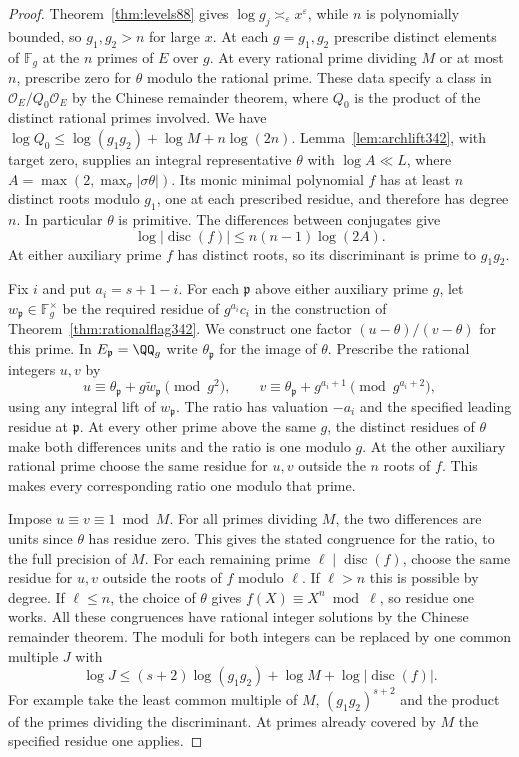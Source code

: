 \documentclass[a4paper,11pt]{article}
\theoremstyle{definition}
\theoremstyle{remark}
\numberwithin{equation}{section}
\begin{document}
\begin{proof}
Theorem~\ref{thm:levels88} gives $\log g_j\asymp_\varepsilon
x^\varepsilon$, while $n$ is polynomially bounded, so $g_1,g_2>n$
for large $x$. At each $g=g_1,g_2$ prescribe distinct elements of
$\mathbb F_g$ at the $n$ primes of $E$ over $g$. At every rational
prime dividing $M$ or at most $n$, prescribe zero for $\theta$ modulo
the rational prime. These data specify a class in
$\mathcal O_E/Q_0\mathcal O_E$ by the Chinese remainder theorem,
where $Q_0$ is the product of the distinct rational primes involved.
We have $\log Q_0\le\log(g_1g_2)+\log M+n\log(2n)$.
Lemma~\ref{lem:archlift342}, with target zero, supplies an integral
representative $\theta$ with $\log A\ll L$, where
$A=\max(2,\max_\sigma|\sigma\theta|)$. Its monic minimal polynomial
$f$ has at least $n$ distinct roots modulo $g_1$, one at each
prescribed residue, and therefore has degree $n$. In particular
$\theta$ is primitive. The differences between conjugates give
\[
                     \log|\operatorname{disc}(f)|
                                \le n(n-1)\log(2A).
\]
At either auxiliary prime $f$ has distinct roots, so its
discriminant is prime to $g_1g_2$.

Fix $i$ and put $a_i=s+1-i$. For each $\mathfrak p$ above either
auxiliary prime $g$, let $w_{\mathfrak p}\in\mathbb F_g^\times$ be
the required residue of $g^{a_i}c_i$ in the construction of
Theorem~\ref{thm:rationalflag342}. We construct one factor
$(u-\theta)/(v-\theta)$ for this prime. In
$E_{\mathfrak p}=\QQ_g$ write $\theta_{\mathfrak p}$ for the image of
$\theta$. Prescribe the rational integers $u,v$ by
\[
 u\equiv\theta_{\mathfrak p}+g\widetilde w_{\mathfrak p}\pmod{g^2},
 \qquad
 v\equiv\theta_{\mathfrak p}+g^{a_i+1}\pmod{g^{a_i+2}},
\]
using any integral lift of $w_{\mathfrak p}$. The ratio has valuation
$-a_i$ and the specified leading residue at $\mathfrak p$. At every
other prime above the same $g$, the distinct residues of $\theta$
make both differences units and the ratio is one modulo $g$.
At the other auxiliary rational prime choose the same residue for
$u,v$ outside the $n$ roots of $f$. This makes every corresponding
ratio one modulo that prime.

Impose $u\equiv v\equiv1\bmod M$. For all primes dividing $M$, the
two differences are units since $\theta$ has residue zero. This gives
the stated congruence for the ratio, to the full precision of $M$.
For each remaining prime $\ell\mid\operatorname{disc}(f)$, choose
the same residue for $u,v$ outside the roots of $f$ modulo $\ell$.
If $\ell>n$ this is possible by degree. If $\ell\le n$, the choice
of $\theta$ gives $f(X)\equiv X^n\bmod\ell$, so residue one works.
All these congruences have rational integer solutions by the
Chinese remainder theorem. The moduli for both integers can be
replaced by one common multiple $J$ with
\[
   \log J\le (s+2)\log(g_1g_2)+\log M+\log|\operatorname{disc}(f)|.
\]
For example take the least common multiple of $M$,
$(g_1g_2)^{s+2}$ and the product of the primes dividing the
discriminant. At primes already covered by $M$ the specified
residue one applies.


\end{proof}
\end{document}
